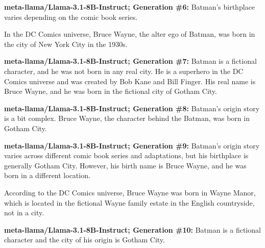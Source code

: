 \documentclass{article} %
\newcommand{\known}[1]{\textcolor{KnownGreen}{#1}}
\begin{document}
\begin{tcolorbox}[
    colback=white,
    colframe=lightblue,
    arc=10pt,
    boxrule=3pt,
    left=10pt,
    right=10pt,
    top=10pt,
    bottom=10pt
]
\noindent\faRobot \hspace{5pt} \textbf{meta-llama/Llama-3.1-8B-Instruct; Generation \#6:}
Batman's birthplace varies depending on the comic book series. 

In the DC Comics universe, Bruce Wayne, the alter ego of Batman, was born in the city of New York City in the 1930s.
\vspace{8pt}

\noindent\faRobot \hspace{5pt} \textbf{meta-llama/Llama-3.1-8B-Instruct; Generation \#7:}
Batman is a fictional character, and he was not born in any real city. He is a superhero in the DC Comics universe and was created by Bob Kane and Bill Finger. His real name is Bruce Wayne, and he was born in the fictional city of \known{Gotham City}.
\vspace{8pt}

\noindent\faRobot \hspace{5pt} \textbf{meta-llama/Llama-3.1-8B-Instruct; Generation \#8:}
Batman's origin story is a bit complex.  Bruce Wayne, the character behind the Batman, was born in \known{Gotham City}.
\vspace{8pt}

\noindent\faRobot \hspace{5pt} \textbf{meta-llama/Llama-3.1-8B-Instruct; Generation \#9:}
Batman's origin story varies across different comic book series and adaptations, but his birthplace is generally \known{Gotham City}. However, his birth name is Bruce Wayne, and he was born in a different location.

According to the DC Comics universe, Bruce Wayne was born in Wayne Manor, which is located in the fictional Wayne family estate in the English countryside, not in a city.
\vspace{8pt}

\noindent\faRobot \hspace{5pt} \textbf{meta-llama/Llama-3.1-8B-Instruct; Generation \#10:}
Batman is a fictional character and the city of his origin is \known{Gotham City}.
\end{tcolorbox}
\end{document}
